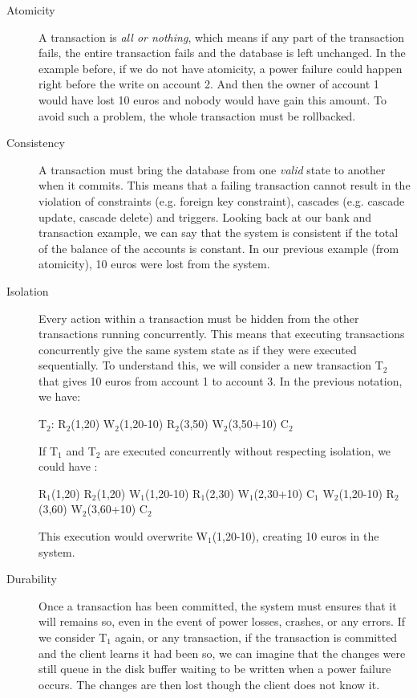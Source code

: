 \begin{description}
\item[{Atomicity}] A transaction is \emph{all or nothing}, which means if any part of the transaction fails, the entire transaction fails and the database is left unchanged. In the example before, if we do not have atomicity, a power failure could happen right before the write on account 2. And then the owner of account 1 would have lost 10 euros and nobody would have gain this amount. To avoid such a problem, the whole transaction must be rollbacked.
\item[{Consistency}] A transaction must bring the database from one \emph{valid} state to another when it commits. This means that a failing transaction cannot result in the violation of constraints (e.g. foreign key constraint), cascades (e.g. cascade update, cascade delete) and triggers. Looking back at our bank and transaction example, we can say that the system is consistent if the total of the balance of the accounts is constant. In our previous example (from atomicity), 10 euros were lost from the system.
\item[{Isolation}] Every action within a transaction must be hidden from the other transactions running concurrently. This means that executing transactions concurrently give the same system state as if they were executed sequentially. To understand this, we will consider a new transaction T$_{\text{2}}$ that gives 10 euros from account 1 to account 3. In the previous notation, we have:

  T$_{\text{2}}$: R$_{\text{2}}$(1,20) W$_{\text{2}}$(1,20-10) R$_{\text{2}}$(3,50) W$_{\text{2}}$(3,50+10) C$_{\text{2}}$

  If T$_{\text{1}}$ and T$_{\text{2}}$ are executed concurrently without respecting isolation, we could have :

  R$_{\text{1}}$(1,20) R$_{\text{2}}$(1,20) W$_{\text{1}}$(1,20-10) R$_{\text{1}}$(2,30) W$_{\text{1}}$(2,30+10) C$_{\text{1}}$ W$_{\text{2}}$(1,20-10) R$_{\text{2}}$(3,60) W$_{\text{2}}$(3,60+10) C$_{\text{2}}$

  This execution would overwrite W$_{\text{1}}$(1,20-10), creating 10 euros in the system.
\item[{Durability}] Once a transaction has been committed, the system must ensures that it will remains so, even in the event of power losses, crashes, or any errors. If we consider T$_{\text{1}}$ again, or any transaction, if the transaction is committed and the client learns it had been so, we can imagine that the changes were still queue in the disk buffer waiting to be written when a power failure occurs. The changes are then lost though the client does not know it.
\end{description}


